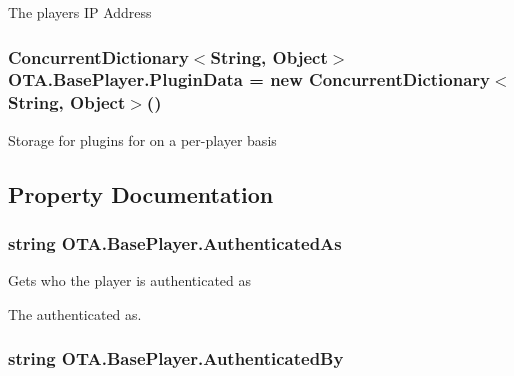 The players I\+P Address 

\hypertarget{class_o_t_a_1_1_base_player_aaeaf4534cc6c64b56a0f94dc835f177f}{}
\subsubsection[{Plugin\+Data}]{\setlength{\rightskip}{0pt plus 5cm}Concurrent\+Dictionary$<$String, Object$>$ O\+T\+A.\+Base\+Player.\+Plugin\+Data = new Concurrent\+Dictionary$<$String, Object$>$()}\label{class_o_t_a_1_1_base_player_aaeaf4534cc6c64b56a0f94dc835f177f}


Storage for plugins for on a per-\/player basis 



\subsection{Property Documentation}
\hypertarget{class_o_t_a_1_1_base_player_aa2c511b2c8c7a81f127e9739aaa317af}{}
\subsubsection[{Authenticated\+As}]{\setlength{\rightskip}{0pt plus 5cm}string O\+T\+A.\+Base\+Player.\+Authenticated\+As\hspace{0.3cm}{\ttfamily [get]}}\label{class_o_t_a_1_1_base_player_aa2c511b2c8c7a81f127e9739aaa317af}


Gets who the player is authenticated as 

The authenticated as.\hypertarget{class_o_t_a_1_1_base_player_a7a17fe6e70fdced08889b091dbc5fa68}{}
\subsubsection[{Authenticated\+By}]{\setlength{\rightskip}{0pt plus 5cm}string O\+T\+A.\+Base\+Player.\+Authenticated\+By\hspace{0.3cm}{\ttfamily [get]}}\label{class_o_t_a_1_1_base_player_a7a17fe6e70fdced08889b091dbc5fa68}



